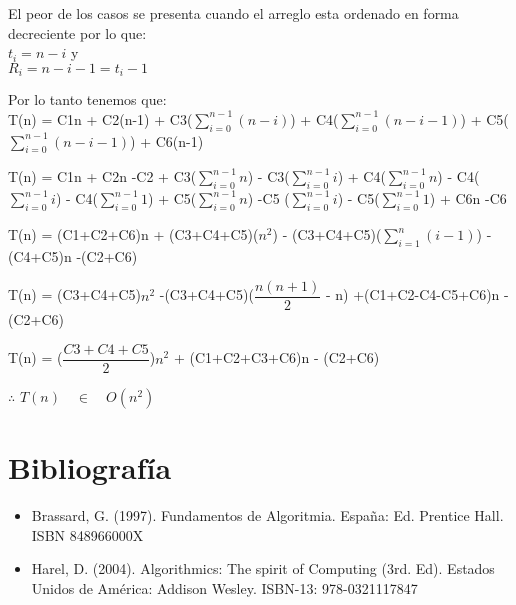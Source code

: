 \documentclass[spanish]{article}
\begin{document}
	\bigskip
	
	El peor de los casos se presenta cuando el arreglo esta ordenado en forma decreciente por lo  que:\\ 
	$t_{i} = n-i$ y\\
	$R_{i} = n-i-1 = t_{i}-1$\\
	\bigskip
	
	Por lo tanto tenemos que:\\
	T(n) = C1n + C2(n-1) + C3($\sum_{i=0}^{n-1}(n-i)$) + C4($\sum_{i=0}^{n-1}(n-i-1)$) + C5($\sum_{i=0}^{n-1}(n-i-1)$) + C6(n-1)
	\bigskip
	
	T(n) = C1n + C2n -C2 + C3($\sum_{i=0}^{n-1}n$) - C3($\sum_{i=0}^{n-1}i$) + C4($\sum_{i=0}^{n-1}n$) - C4($\sum_{i=0}^{n-1}i$) - C4($\sum_{i=0}^{n-1}1$) + C5($\sum_{i=0}^{n-1}n$) -C5 ($\sum_{i=0}^{n-1}i$) - C5($\sum_{i=0}^{n-1}1$) + C6n -C6
	\bigskip
	
	T(n) = (C1+C2+C6)n + (C3+C4+C5)($n^{2}$) - (C3+C4+C5)($\sum_{i=1}^{n}(i-1)$) - (C4+C5)n -(C2+C6)
	\bigskip
	
	T(n) = (C3+C4+C5)$n^{2}$ -(C3+C4+C5)($\dfrac{n(n+1)}{2}$ - n) +(C1+C2-C4-C5+C6)n - (C2+C6)
	\bigskip
	
	T(n) = ($\dfrac{C3+C4+C5}{2}$)$n^{2}$	+ (C1+C2+C3+C6)n - (C2+C6)
	\bigskip
	
	$\therefore$
	$ T(n) \quad \in \quad O(n^{2})$
	\bigskip	
	
	\section{Bibliografía}
	\begin{itemize}
		\item Brassard, G. (1997). Fundamentos de Algoritmia. España: Ed. Prentice Hall. ISBN 		848966000X
		\item Harel, D. (2004). Algorithmics: The spirit of Computing (3rd. Ed). Estados Unidos de América: Addison
Wesley. ISBN-13: 978-0321117847
	\end{itemize}
	
\end{document}
